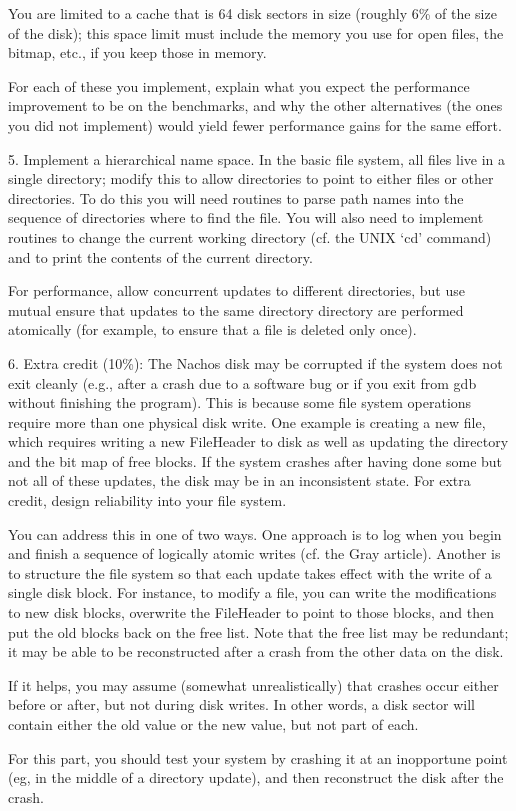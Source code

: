 \begin{description}
\begin{description}
You are limited to a cache that is 64 disk sectors in size (roughly 6\%
of the size of the disk); this space limit must include the memory you
use for open files, the bitmap, etc., if you keep those in memory.

\end{description}

For each of these you implement, explain what you expect the
performance improvement to be on the benchmarks, and why
the other alternatives (the ones you did not implement) would yield
fewer performance gains for the same effort.

\item{5.}
Implement a hierarchical name space.  In the basic file system,
all files live in a single directory; modify this to allow
directories to point to either files or other directories.
To do this you will need routines to parse path names into
the sequence of directories where to find the file.
You will also need to implement routines to change the
current working directory (cf. the UNIX `cd' command) and to
print the contents of the current directory.

For performance, allow concurrent updates to different directories,
but use mutual ensure that updates to the same directory directory
are performed atomically (for example, to ensure that a file is
deleted only once).

\item{6. Extra credit (10\%):}
The Nachos disk may be corrupted if the system does not
exit cleanly (e.g., after a crash due
to a software bug or if you exit from gdb without finishing the program).
This is because some file system operations require more than one
physical disk write.  One example is creating a new file, which requires
writing a new FileHeader to disk as well as updating the directory
and the bit map of free blocks.  If the system crashes after having
done some but not all of these updates, the disk may be in an inconsistent
state.  For extra credit, design reliability into your file system.

You can address this in one of two ways.  One approach is to
log when you begin and finish a sequence of logically atomic
writes (cf. the Gray article).  Another is to structure the file
system so that each update takes effect with the write of a single disk block.
For instance, to modify a file, you can write the modifications
to new disk blocks, overwrite the FileHeader to point to those blocks,
and then put the old blocks back on the free list.  Note that
the free list may be redundant; it may be able to be reconstructed after
a crash from the other data on the disk.

If it helps, you may assume (somewhat unrealistically) that crashes occur
either before or after, but not during disk writes.  In other
words, a disk sector will contain either the old value or the new
value, but not part of each.

For this part, you should test your system by crashing it at an
inopportune point (eg, in the middle of a directory update), and
then reconstruct the disk after the crash.
\end{description}

